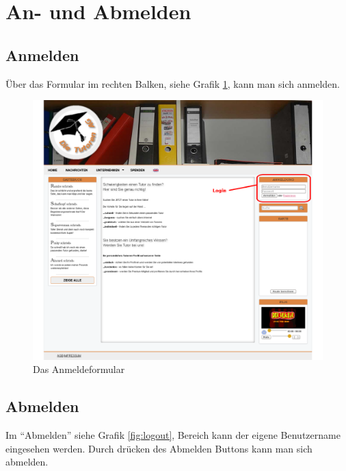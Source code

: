 \section{An- und Abmelden}

\subsection{Anmelden}

Über das Formular im rechten Balken, siehe Grafik \ref{fig:login}, kann man sich anmelden.

\begin{figure}[!htbp]
 \centering
 \includegraphics[width=1\textwidth]{../Screenshots/de/login}
 \caption{Das Anmeldeformular}
 \label{fig:login}
\end{figure}

\newpage

\subsection{Abmelden}

Im "`Abmelden"' siehe Grafik \ref{fig:logout}, Bereich kann der eigene Benutzername eingesehen werden. Durch drücken des Abmelden Buttons kann man sich abmelden.

